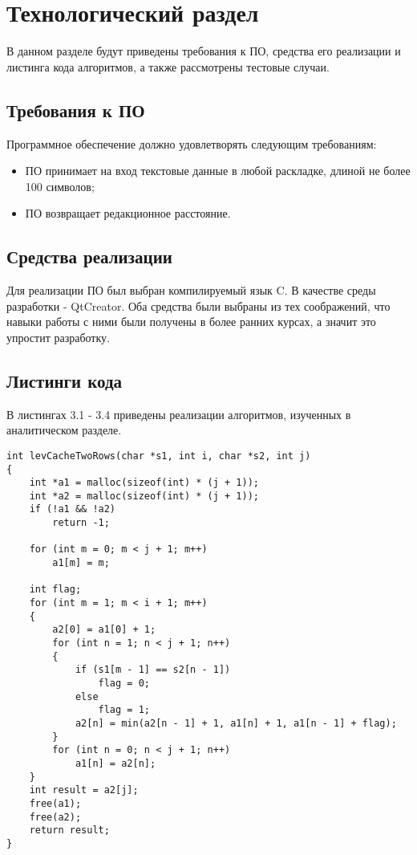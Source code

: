 \chapter{Технологический раздел}

В данном разделе будут приведены требования к ПО, средства его реализации и листинга кода алгоритмов, а также рассмотрены тестовые случаи.

\section{Требования к ПО}

Программное обеспечение должно удовлетворять следующим требованиям:
\begin{itemize}
	\item ПО принимает на вход текстовые данные в любой раскладке, длиной не более 100 символов;
	\item ПО возвращает редакционное расстояние.
\end{itemize}

\section{Средства реализации} 

Для реализации ПО был выбран компилируемый язык C. В качестве среды разработки - QtCreator. Оба средства были выбраны из тех соображений, что навыки работы с ними были получены в более ранних курсах, а значит это упростит разработку.

\section{Листинги кода}

В листингах 3.1 - 3.4 приведены реализации алгоритмов, изученных в аналитическом разделе.

\begin{lstlisting}[label=levCacheTwoRows, caption=Нерекурсивный алгоритм поиска расстояния Левенштейна с кэшем в форме 2 строк]
int levCacheTwoRows(char *s1, int i, char *s2, int j)
{
    int *a1 = malloc(sizeof(int) * (j + 1));
    int *a2 = malloc(sizeof(int) * (j + 1));
    if (!a1 && !a2)
        return -1;

    for (int m = 0; m < j + 1; m++)
        a1[m] = m;

    int flag;
    for (int m = 1; m < i + 1; m++)
    {
        a2[0] = a1[0] + 1;
        for (int n = 1; n < j + 1; n++)
        {
            if (s1[m - 1] == s2[n - 1])
                flag = 0;
            else
                flag = 1;
            a2[n] = min(a2[n - 1] + 1, a1[n] + 1, a1[n - 1] + flag);
        }
        for (int n = 0; n < j + 1; n++)
            a1[n] = a2[n];
    }
    int result = a2[j];
    free(a1);
    free(a2);
    return result;
}
\end{lstlisting}

